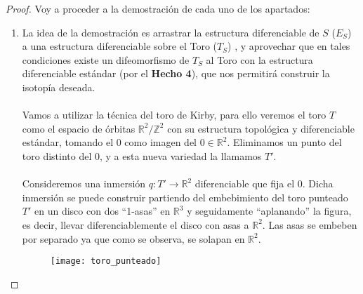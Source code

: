 \begin{proof}
	Voy a proceder a la demostración de cada uno de los apartados: \\
	\begin{enumerate}
		\item La idea de la demostración es arrastrar la estructura diferenciable de $S$ ($E_S$) a una estructura diferenciable sobre el Toro ($T_S$) , y aprovechar que en tales condiciones existe un difeomorfismo de $T_S$ al Toro con la estructura diferenciable estándar (por el \textbf{Hecho 4}), que nos permitirá construir la isotopía deseada.\\
			\\ Vamos a utilizar la técnica del toro de Kirby, para ello veremos el toro $T$ como el espacio de órbitas $\mathbb{R}^2/\mathbb{Z}^2$ con su estructura topológica y diferenciable estándar, tomando el $0$ como imagen del $0\in \mathbb{R}^2$. Eliminamos un punto del toro distinto del $0$, y a esta nueva variedad la llamamos $T'$. \\
			\\ Consideremos una inmersión $q: T' \rightarrow \mathbb{R}^2$ diferenciable que fija el $0$. Dicha inmersión se puede construir partiendo del embebimiento del toro punteado $T'$ en un disco con dos ``1-asas'' en $\mathbb{R}^3$ y seguidamente ``aplanando'' la figura, es decir, llevar diferenciablemente el disco con asas a $\mathbb{R}^2$. Las asas se embeben por separado ya que como se observa, se solapan en $\mathbb{R}^2$.\\
			
			\begin{figure}[h]
  				\centering
  				\texttt{[image: toro\_punteado]}
  				\label{fig:toro_punteado}
			\end{figure}
			

\end{enumerate}
\end{proof}
